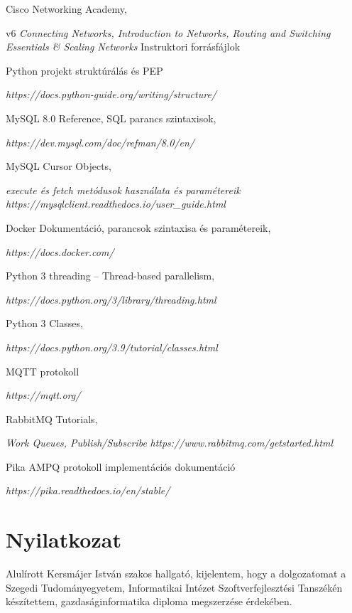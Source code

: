 \documentclass[12pt]{report}
\begin{document}
\begin{thebibliography}{99}

Cisco Networking Academy,

v6 \emph{Connecting Networks, Introduction to Networks, Routing and Switching Essentials \& Scaling Networks} Instruktori forrásfájlok


Python projekt struktúrálás és PEP

\emph{https://docs.python-guide.org/writing/structure/}


MySQL 8.0 Reference, SQL parancs szintaxisok,

\emph{https://dev.mysql.com/doc/refman/8.0/en/}


MySQL Cursor Objects,

\emph{execute és fetch metódusok használata és paramétereik}
\emph{https://mysqlclient.readthedocs.io/user\_guide.html}


Docker Dokumentáció, parancsok szintaxisa és paramétereik,

\emph{https://docs.docker.com/}


Python 3 threading -- Thread-based parallelism,

\emph{https://docs.python.org/3/library/threading.html}


Python 3 Classes,

\emph{https://docs.python.org/3.9/tutorial/classes.html}


MQTT protokoll

\emph{https://mqtt.org/}


RabbitMQ Tutorials,

\emph{Work Queues, Publish/Subscribe}
\emph{https://www.rabbitmq.com/getstarted.html}


Pika AMPQ protokoll implementációs dokumentáció

\emph{https://pika.readthedocs.io/en/stable/}

\end{thebibliography}


\chapter*{Nyilatkozat}

\noindent
Alulírott Kersmájer István szakos hallgató, kijelentem, hogy a dolgozatomat a Szegedi Tudományegyetem, Informatikai Intézet Szoftverfejlesztési Tanszékén készítettem, gazdaságinformatika diploma megszerzése érdekében.
\end{document}
